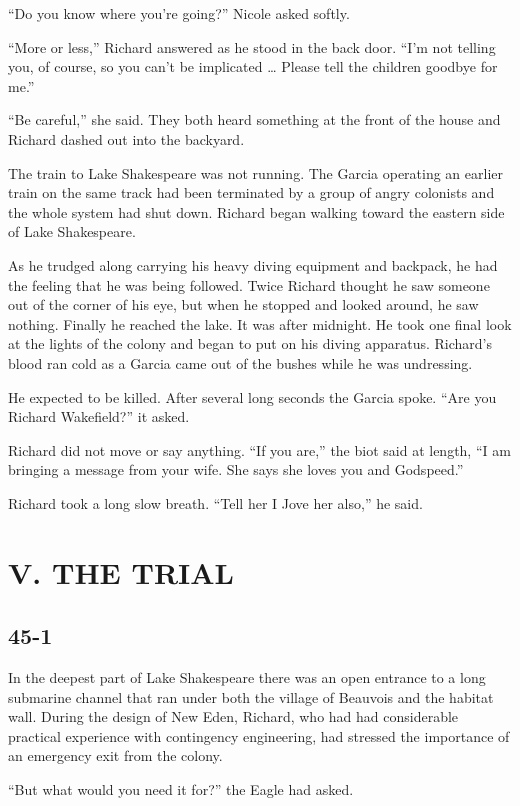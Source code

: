 \documentclass[]{article}
\begin{document}
{“Do you know where you’re going?” Nicole asked softly.

“More or less,” Richard answered as he stood in the back door. “I’m not telling you, of course, so you can’t be implicated … Please tell the children goodbye for me.”

“Be careful,” she said. They both heard something at the front of the house and Richard dashed out into the backyard.

The train to Lake Shakespeare was not running. The Garcia operating an earlier train on the same track had been terminated by a group of angry colonists and the whole system had shut down. Richard began walking toward the eastern side of Lake Shakespeare.

As he trudged along carrying his heavy diving equipment and backpack, he had the feeling that he was being followed. Twice Richard thought he saw someone out of the corner of his eye, but when he stopped and looked around, he saw nothing. Finally he reached the lake. It was after midnight. He took one final look at the lights of the colony and began to put on his diving apparatus. Richard’s blood ran cold as a Garcia came out of the bushes while he was undressing.

He expected to be killed. After several long seconds the Garcia spoke. “Are you Richard Wakefield?” it asked.

Richard did not move or say anything. “If you are,” the biot said at length, “I am bringing a message from your wife. She says she loves you and Godspeed.”

Richard took a long slow breath. “Tell her I Jove her also,” he said.


\section{V. THE TRIAL}

\subsection{45-1}

In the deepest part of Lake Shakespeare there was an open entrance to a long submarine channel that ran under both the village of Beauvois and the habitat wall. During the design of New Eden, Richard, who had had considerable practical experience with contingency engineering, had stressed the importance of an emergency exit from the colony.

“But what would you need it for?” the Eagle had asked.

}
\end{document}
